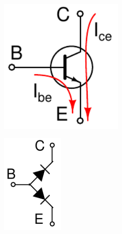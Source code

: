 \documentclass[beamer]{standalone}
\begin{document}
\begin{frame}
\begin{columns}[t]
\begin{column}{.75\textwidth}
	\end{column}
	\begin{column}{.25\textwidth}
		\begin{figure}
			\includegraphics[width=0.80\textwidth]{./schematics/npn_transistor_with_currents.pdf}
		\end{figure}
		\begin{figure}
			\includegraphics[width=0.40\textwidth]{./schematics/npn_diodes.pdf}
		\end{figure}

	\end{column}
\end{columns}
\end{frame}
	
\end{document}
